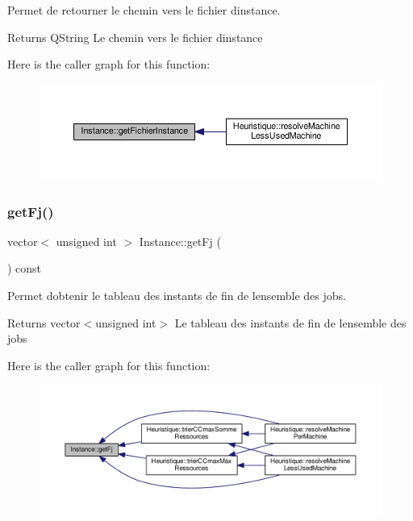 Permet de retourner le chemin vers le fichier d\textquotesingle{}instance. 

\begin{DoxyReturn}{Returns}
Q\+String Le chemin vers le fichier d\textquotesingle{}instance 
\end{DoxyReturn}
Here is the caller graph for this function\+:\nopagebreak
\begin{figure}[H]
\begin{center}
\leavevmode
\includegraphics[width=350pt]{classInstance_a783365375cdab53149f87208374331a7_icgraph}
\end{center}
\end{figure}
\mbox{\label{classInstance_af7b70cbd8670e4eb213fbd2b81eca6f0}} 
\subsubsection{\texorpdfstring{get\+Fj()}{getFj()}}
{\footnotesize\ttfamily vector$<$ unsigned int $>$ Instance\+::get\+Fj (\begin{DoxyParamCaption}{ }\end{DoxyParamCaption}) const}



Permet d\textquotesingle{}obtenir le tableau des instants de fin de l\textquotesingle{}ensemble des jobs. 

\begin{DoxyReturn}{Returns}
vector$<$unsigned int$>$ Le tableau des instants de fin de l\textquotesingle{}ensemble des jobs 
\end{DoxyReturn}
Here is the caller graph for this function\+:\nopagebreak
\begin{figure}[H]
\begin{center}
\leavevmode
\includegraphics[width=350pt]{classInstance_af7b70cbd8670e4eb213fbd2b81eca6f0_icgraph}
\end{center}
\end{figure}
\mbox{\label{classInstance_a8bf10528309a62149cc188dd2b80f0b7}} 

